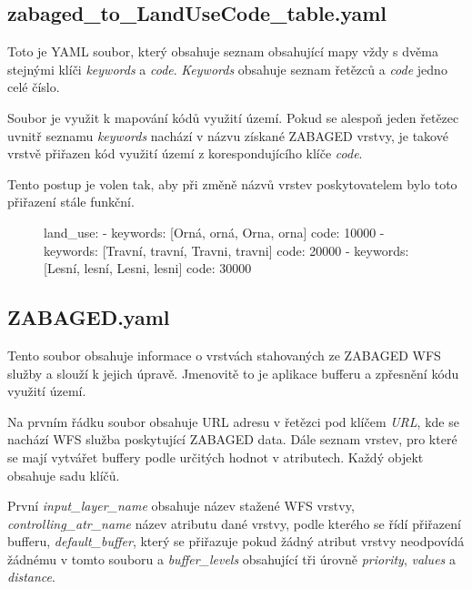\documentclass[a4paper,oneside,12pt]{book}
\begin{document}
\subsection{zabaged\_to\_LandUseCode\_table.yaml} \label{zabaged_to_LandUseCode_table.yaml}
\hspace{10mm}Toto je YAML soubor, který obsahuje seznam obsahující mapy vždy s dvěma stejnými klíči \textit{keywords} a \textit{code}. \textit{Keywords} obsahuje seznam řetězců a \textit{code} jedno celé číslo.

\hspace{10mm}Soubor je využit k mapování kódů využití území. Pokud se alespoň jeden řetězec uvnitř seznamu \textit{keywords} nachází v názvu získané ZABAGED vrstvy, je takové vrstvě přiřazen kód využití území z korespondujícího klíče \textit{code}.

\hspace{10mm}Tento postup je volen tak, aby při změně názvů vrstev poskytovatelem bylo toto přiřazení stále funkční.

\begin{figure}[H]
\begin{pythoncode}[style=myyaml, caption={Ukázka zabaged\_to\_LandUseCode\_table.yaml},label={kod:zabaged_to_LandUseCode_table.yaml}]
land_use:
  - keywords: [Orná, orná, Orna, orna]
    code: 10000
  - keywords: [Travní, travní, Travni, travni]
    code: 20000
  - keywords: [Lesní, lesní, Lesni, lesni]
    code: 30000
\end{pythoncode}
\end{figure}

\subsection{ZABAGED.yaml} \label{ZABAGED.yaml}
\hspace{10mm} Tento soubor obsahuje informace o vrstvách stahovaných ze ZABAGED WFS služby a slouží k jejich úpravě. Jmenovitě to je aplikace bufferu a zpřesnění kódu využití území.

\hspace{10mm}Na prvním řádku soubor obsahuje URL adresu v řetězci pod klíčem \textit{URL}, kde se nachází WFS služba poskytující ZABAGED data. Dále seznam vrstev, pro které se mají vytvářet buffery podle určitých hodnot v atributech. Každý objekt obsahuje sadu klíčů.

\hspace{10mm}První \textit{input\_layer\_name} obsahuje název stažené WFS vrstvy, \newline \textit{controlling\_atr\_name} název atributu dané vrstvy, podle kterého se řídí přiřazení bufferu, \textit{default\_buffer}, který se přiřazuje pokud žádný atribut vrstvy neodpovídá žádnému v tomto souboru a \textit{buffer\_levels} obsahující tři úrovně \textit{priority}, \textit{values} a \textit{distance}.
\end{document}
